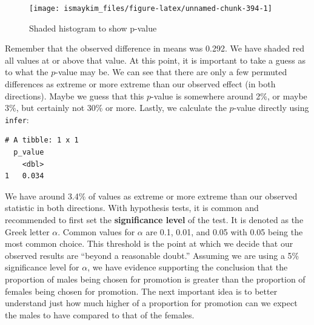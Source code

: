 \documentclass[12pt, krantz2,]{krantz}
\makeatletter
\newenvironment{Shaded}{\begin{snugshade}}{\end{snugshade}}
\newcommand{\DataTypeTok}[1]{\textcolor[rgb]{0.27,0.27,0.27}{#1}}
\newcommand{\KeywordTok}[1]{\textcolor[rgb]{0.27,0.27,0.27}{\textbf{#1}}}
\newcommand{\NormalTok}[1]{#1}
\newcommand{\OperatorTok}[1]{\textcolor[rgb]{0.43,0.43,0.43}{\textbf{#1}}}
\newcommand{\StringTok}[1]{\textcolor[rgb]{0.5,0.5,0.5}{#1}}
\newenvironment{kframe}{%
\medskip{}
\setlength{\fboxsep}{.8em}
 \def\at@end@of@kframe{}%
 \ifinner\ifhmode%
  \def\at@end@of@kframe{\end{minipage}}%
  \begin{minipage}{\columnwidth}%
 \fi\fi%
 \def\FrameCommand##1{\hskip\@totalleftmargin \hskip-\fboxsep
 \colorbox{shadecolor}{##1}\hskip-\fboxsep
     \hskip-\linewidth \hskip-\@totalleftmargin \hskip\columnwidth}%
 \MakeFramed {\advance\hsize-\width
   \@totalleftmargin\z@ \linewidth\hsize
   \@setminipage}}%
 {\par\unskip\endMakeFramed%
 \at@end@of@kframe}
\renewenvironment{Shaded}{\begin{kframe}}{\end{kframe}}
\makeatother
\begin{document}
\begin{figure}

{\centering \texttt{[image: ismaykim\_files/figure-latex/unnamed-chunk-394-1]} 

}

\caption{Shaded histogram to show p-value}\label{fig:unnamed-chunk-394}
\end{figure}

Remember that the observed difference in means was 0.292. We have shaded red all values at or above that value. At this point, it is important to take a guess as to what the \(p\)-value may be. We can see that there are only a few permuted differences as extreme or more extreme than our observed effect (in both directions). Maybe we guess that this \(p\)-value is somewhere around 2\%, or maybe 3\%, but certainly not 30\% or more. Lastly, we calculate the \(p\)-value directly using \texttt{infer}:

\begin{Shaded}
\end{Shaded}

\begin{verbatim}
# A tibble: 1 x 1
  p_value
    <dbl>
1   0.034
\end{verbatim}

We have around 3.4\% of values as extreme or more extreme than our observed statistic in both directions. With hypothesis tests, it is common and recommended to first set the \textbf{significance level} of the test. It is denoted as the Greek letter \(\alpha\). Common values for \(\alpha\) are 0.1, 0.01, and 0.05 with 0.05 being the most common choice. This threshold is the point at which we decide that our observed results are ``beyond a reasonable doubt.'' Assuming we are using a 5\% significance level for \(\alpha\), we have evidence supporting the conclusion that the proportion of males being chosen for promotion is greater than the proportion of females being chosen for promotion. The next important idea is to better understand just how much higher of a proportion for promotion can we expect the males to have compared to that of the females.
\end{document}
